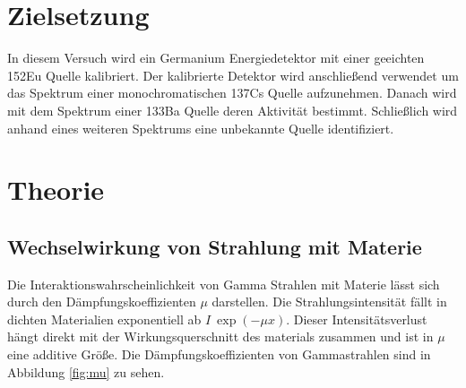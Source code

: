 \section{Zielsetzung}
In diesem Versuch wird ein Germanium Energiedetektor mit einer geeichten 152Eu
Quelle kalibriert. Der kalibrierte Detektor wird anschließend verwendet um das
Spektrum einer monochromatischen 137Cs Quelle aufzunehmen. Danach wird mit dem
Spektrum einer 133Ba Quelle deren Aktivität bestimmt. Schließlich wird anhand
eines weiteren Spektrums eine unbekannte Quelle identifiziert.



\section{Theorie}
\subsection[]{Wechselwirkung von Strahlung mit Materie}
Die Interaktionswahrscheinlichkeit von Gamma Strahlen mit Materie lässt sich
durch den Dämpfungskoeffizienten $\mu$ darstellen. Die Strahlungsintensität
fällt in dichten Materialien exponentiell ab $I ~ \exp(-\mu x)$. Dieser
Intensitätsverlust hängt direkt mit der Wirkungsquerschnitt des materials
zusammen und ist in $\mu$ eine additive Größe. Die Dämpfungskoeffizienten von
Gammastrahlen sind in Abbildung \ref{fig:mu} zu sehen.

